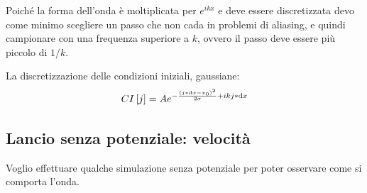 Poich\'e la forma dell'onda \`e moltiplicata per $e^{ikx}$ e deve essere discretizzata devo come minimo scegliere un passo che non cada in problemi di aliasing, e quindi campionare con una frequenza superiore a $k$, ovvero il passo deve essere pi\`u piccolo di $1/k$.

La discretizzazione delle condizioni iniziali, gaussiane:
\begin{equation}
  CI\left[ j \right]= Ae^{-\frac{\left( j*\mathrm{d} x-x_0 \right)^2}{2\sigma}+i k j*\mathrm{d} x}
\end{equation}

\subsection{Lancio senza potenziale: velocit\`a}\label{sec:velocita}
Voglio effettuare qualche simulazione senza potenziale per poter osservare come si comporta l'onda.

